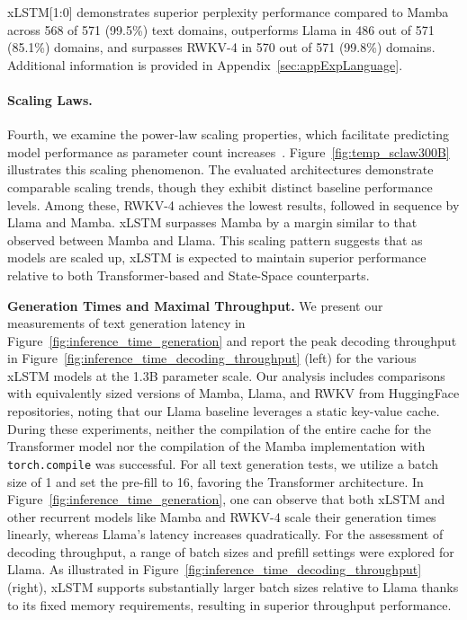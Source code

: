 xLSTM[1:0] demonstrates superior perplexity performance compared to Mamba across 568 of 571 (99.5\%) text domains, outperforms Llama in 486 out of 571 (85.1\%) domains, and surpasses RWKV-4 in 570 out of 571 (99.8\%) domains. Additional information is provided in Appendix~\ref{sec:appExpLanguage}.

\paragraph{Scaling Laws.} Fourth, we examine the power-law scaling properties, which facilitate predicting model performance as parameter count increases~\citep{Kaplan:20,Brown:20short}. Figure~\ref{fig:temp_sclaw300B} illustrates this scaling phenomenon. The evaluated architectures demonstrate comparable scaling trends, though they exhibit distinct baseline performance levels. Among these, RWKV-4 achieves the lowest results, followed in sequence by Llama and Mamba. xLSTM surpasses Mamba by a margin similar to that observed between Mamba and Llama. This scaling pattern suggests that as models are scaled up, xLSTM is expected to maintain superior performance relative to both Transformer-based and State-Space counterparts.

\textbf{Generation Times and Maximal Throughput.} We present our measurements of text generation latency in Figure~\ref{fig:inference_time_generation} and report the peak decoding throughput in Figure~\ref{fig:inference_time_decoding_throughput} (left) for the various xLSTM models at the 1.3B parameter scale. Our analysis includes comparisons with equivalently sized versions of Mamba, Llama, and RWKV from HuggingFace repositories, noting that our Llama baseline leverages a static key-value cache. During these experiments, neither the compilation of the entire cache for the Transformer model nor the compilation of the Mamba implementation with \texttt{torch.compile} was successful. For all text generation tests, we utilize a batch size of 1 and set the pre-fill to 16, favoring the Transformer architecture. 
In Figure~\ref{fig:inference_time_generation}, one can observe that both xLSTM and other recurrent models like Mamba and RWKV-4 scale their generation times linearly, whereas Llama's latency increases quadratically. For the assessment of decoding throughput, a range of batch sizes and prefill settings were explored for Llama. 
As illustrated in Figure~\ref{fig:inference_time_decoding_throughput} (right), xLSTM supports substantially larger batch sizes relative to Llama thanks to its fixed memory requirements, resulting in superior throughput performance.

